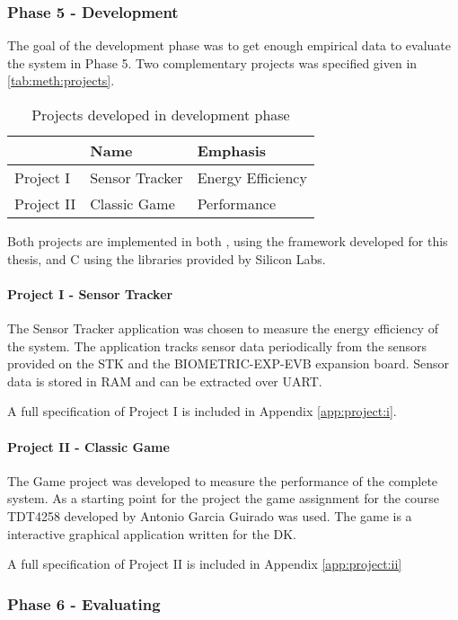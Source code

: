 \subsubsection{Phase 5 - Development}

The goal of the development phase was to get enough empirical data to evaluate the system in Phase 5.
Two complementary projects was specified given in \autoref{tab:meth:projects}.

\begin{table}[H]
  \begin{tabular}{|l|l|l|}
    \hline
    & Name & Emphasis \\
    \hline
    \hline
    Project I & Sensor Tracker & Energy Efficiency \\
    \hline
    Project II & Classic Game & Performance \\
    \hline
  \end{tabular}
  \caption{Projects developed in development phase}
  \label{tab:meth:projects}
\end{table}

Both projects are implemented in both \rust, using the framework developed for this thesis, and C using the libraries provided by Silicon Labs.

\paragraph{Project I - Sensor Tracker}
The Sensor Tracker application was chosen to measure the energy efficiency of the system.
The application tracks sensor data periodically from the sensors provided on the STK and the BIOMETRIC-EXP-EVB expansion board.
Sensor data is stored in RAM and can be extracted over UART.

A full specification of Project I is included in Appendix \autoref{app:project:i}.

\paragraph{Project II - Classic Game}
The Game project was developed to measure the performance of the complete system.
As a starting point for the project the game assignment for the course TDT4258 developed by Antonio Garcia Guirado was used.
The game is a interactive graphical application written for the DK.

A full specification of Project II is included in Appendix \autoref{app:project:ii}

\subsubsection{Phase 6 - Evaluating}
